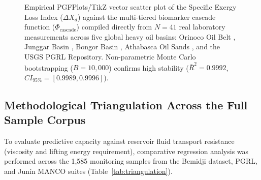 \documentclass[review,12pt]{elsarticle}
\begin{document}
\begin{figure}[ht!]
\centering
{}
\caption{Empirical PGFPlots/TikZ vector scatter plot of the Specific Exergy Loss Index ($\Delta X_d$) against the multi-tiered biomarker cascade function ($\Phi_{\text{cascade}}$) compiled directly from $N=41$ real laboratory measurements across five global heavy oil basins: Orinoco Oil Belt \citep{lopez2014biodegradation}, Junggar Basin \citep{chang2022biodegradation}, Bongor Basin \citep{mahmoodi2019biodegradation}, Athabasca Oil Sands \citep{larter2012molecular}, and the USGS PGRL Repository. Non-parametric Monte Carlo bootstrapping ($B=10,000$) confirms high stability ($\bar{R}^2 = 0.9992$, $CI_{95\%} = [0.9989, 0.9996]$).}
\label{fig:biomarker_pgfplots_real}
\end{figure}

\subsection{Methodological Triangulation Across the Full Sample Corpus}
To evaluate predictive capacity against reservoir fluid transport resistance (viscosity and lifting energy requirement), comparative regression analysis was performed across the 1,585 monitoring samples from the Bemidji dataset, PGRL, and Junín MANCO suites (Table~\ref{tab:triangulation}).
\end{document}
